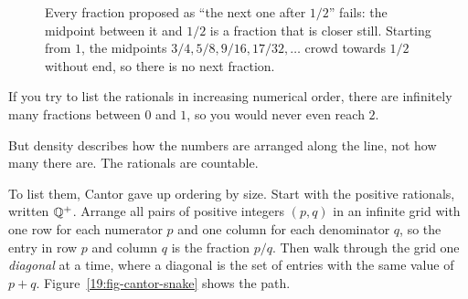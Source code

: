 \begin{figure}[htbp]
\centering
{}
\caption{Every fraction proposed as ``the next one after $1/2$'' fails: the midpoint between it and $1/2$ is a fraction that is closer still. Starting from $1$, the midpoints $3/4, 5/8, 9/16, 17/32, \dots$ crowd towards $1/2$ without end, so there is no next fraction.}
\label{19:fig-rationals-dense}
\end{figure}

If you try to list the rationals in increasing numerical order, there are infinitely many fractions between $0$ and $1$, so you would never even reach $2$.

But density describes how the numbers are arranged along the line, not how many there are. The rationals are countable.

To list them, Cantor gave up ordering by size. Start with the positive rationals, written $\mathbb{Q}^+$. Arrange all pairs of positive integers $(p, q)$ in an infinite grid with one row for each numerator $p$ and one column for each denominator $q$, so the entry in row $p$ and column $q$ is the fraction $p/q$. Then walk through the grid one \emph{diagonal} at a time, where a diagonal is the set of entries with the same value of $p + q$. Figure~\ref{19:fig-cantor-snake} shows the path.


